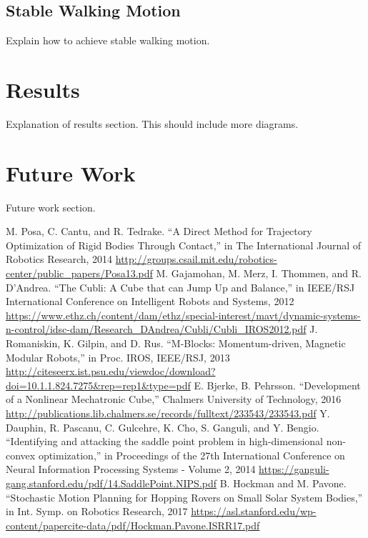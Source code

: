 \documentclass[conference]{IEEEtran}
\begin{document}
\subsection{Stable Walking Motion}

Explain how to achieve stable walking motion.

\section*{Results}

Explanation of results section. This should include more diagrams.

\section*{Future Work}

Future work section.

\begin{thebibliography}{00}
 M. Posa, C. Cantu, and R. Tedrake. ``A Direct Method for Trajectory Optimization of Rigid Bodies Through Contact,'' in The International Journal of Robotics Research, 2014 \url{http://groups.csail.mit.edu/robotics-center/public_papers/Posa13.pdf}
 M. Gajamohan, M. Merz, I. Thommen, and R. D'Andrea. ``The Cubli: A Cube that can Jump Up and Balance,'' in IEEE/RSJ International Conference on
Intelligent Robots and Systems, 2012 \url{https://www.ethz.ch/content/dam/ethz/special-interest/mavt/dynamic-systems-n-control/idsc-dam/Research_DAndrea/Cubli/Cubli_IROS2012.pdf}
 J. Romaniskin, K. Gilpin, and D. Rus. ``M-Blocks: Momentum-driven, Magnetic Modular Robots,'' in Proc. IROS, IEEE/RSJ, 2013
\url{http://citeseerx.ist.psu.edu/viewdoc/download?doi=10.1.1.824.7275&rep=rep1&type=pdf}
 E. Bjerke, B. Pehrsson. ``Development of a Nonlinear Mechatronic Cube,'' Chalmers University of Technology, 2016
\url{http://publications.lib.chalmers.se/records/fulltext/233543/233543.pdf}
 Y. Dauphin, R. Pascanu, C. Gulcehre, K. Cho, S. Ganguli, and Y. Bengio. ``Identifying and attacking the saddle point problem in high-dimensional non-convex optimization,'' in Proceedings of the 27th International Conference on Neural Information Processing Systems - Volume 2, 2014
\url{https://ganguli-gang.stanford.edu/pdf/14.SaddlePoint.NIPS.pdf}
 B. Hockman and M. Pavone. ``Stochastic Motion Planning for Hopping Rovers on Small Solar System Bodies,'' in Int. Symp. on Robotics Research, 2017
\url{https://asl.stanford.edu/wp-content/papercite-data/pdf/Hockman.Pavone.ISRR17.pdf}
\end{thebibliography}


\vspace{12pt}
\end{document}
